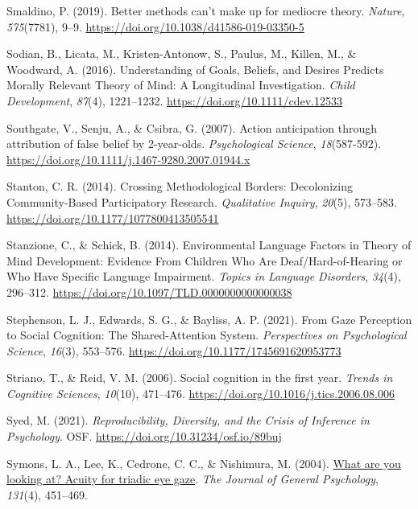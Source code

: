 \documentclass[
]{scrbook}
\newlength{\cslhangindent}
\newenvironment{CSLReferences}[2] %
 {\begin{list}{}{%
  \setlength{\itemindent}{0pt}
  \setlength{\leftmargin}{0pt}
  \setlength{\parsep}{0pt}
  \ifodd #1
   \setlength{\leftmargin}{\cslhangindent}
   \setlength{\itemindent}{-1\cslhangindent}
  \fi
  \setlength{\itemsep}{#2\baselineskip}}}
 {\end{list}}
\begin{document}
\begin{CSLReferences}{1}{0}
Smaldino, P. (2019). Better methods can't make up for mediocre theory. \emph{Nature}, \emph{575}(7781), 9--9. \url{https://doi.org/10.1038/d41586-019-03350-5}

Sodian, B., Licata, M., Kristen-Antonow, S., Paulus, M., Killen, M., \& Woodward, A. (2016). Understanding of {Goals}, {Beliefs}, and {Desires Predicts Morally Relevant Theory} of {Mind}: {A Longitudinal Investigation}. \emph{Child Development}, \emph{87}(4), 1221--1232. \url{https://doi.org/10.1111/cdev.12533}

Southgate, V., Senju, A., \& Csibra, G. (2007). Action anticipation through attribution of false belief by 2-year-olds. \emph{Psychological Science}, \emph{18}(587-592). \url{https://doi.org/10.1111/j.1467-9280.2007.01944.x}

Stanton, C. R. (2014). Crossing {Methodological Borders}: {Decolonizing Community-Based Participatory Research}. \emph{Qualitative Inquiry}, \emph{20}(5), 573--583. \url{https://doi.org/10.1177/1077800413505541}

Stanzione, C., \& Schick, B. (2014). Environmental {Language Factors} in {Theory} of {Mind Development}: {Evidence From Children Who Are Deaf}/{Hard-of-Hearing} or {Who Have Specific Language Impairment}. \emph{Topics in Language Disorders}, \emph{34}(4), 296--312. \url{https://doi.org/10.1097/TLD.0000000000000038}

Stephenson, L. J., Edwards, S. G., \& Bayliss, A. P. (2021). From {Gaze Perception} to {Social Cognition}: {The Shared-Attention System}. \emph{Perspectives on Psychological Science}, \emph{16}(3), 553--576. \url{https://doi.org/10.1177/1745691620953773}

Striano, T., \& Reid, V. M. (2006). Social cognition in the first year. \emph{Trends in Cognitive Sciences}, \emph{10}(10), 471--476. \url{https://doi.org/10.1016/j.tics.2006.08.006}

Syed, M. (2021). \emph{Reproducibility, {Diversity}, and the {Crisis} of {Inference} in {Psychology}}. OSF. \url{https://doi.org/10.31234/osf.io/89buj}

Symons, L. A., Lee, K., Cedrone, C. C., \& Nishimura, M. (2004). \href{https://www.ncbi.nlm.nih.gov/pmc/articles/PMC2564292}{What are you looking at? {Acuity} for triadic eye gaze}. \emph{The Journal of General Psychology}, \emph{131}(4), 451--469.


\end{CSLReferences}
\end{document}
